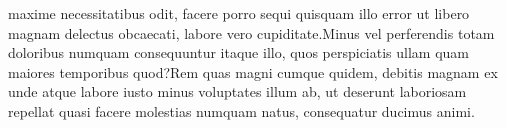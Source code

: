 \documentclass[letterpaper]{article}
\begin{document}
maxime necessitatibus odit, facere porro sequi quisquam illo error ut libero magnam delectus obcaecati, labore vero cupiditate.Minus vel perferendis totam doloribus numquam consequuntur itaque illo, quos perspiciatis ullam quam maiores temporibus quod?Rem quas magni cumque quidem, debitis magnam ex unde atque labore iusto minus voluptates illum ab, ut deserunt laboriosam repellat quasi facere molestias numquam natus, consequatur ducimus animi.\clearpage

\end{document}
